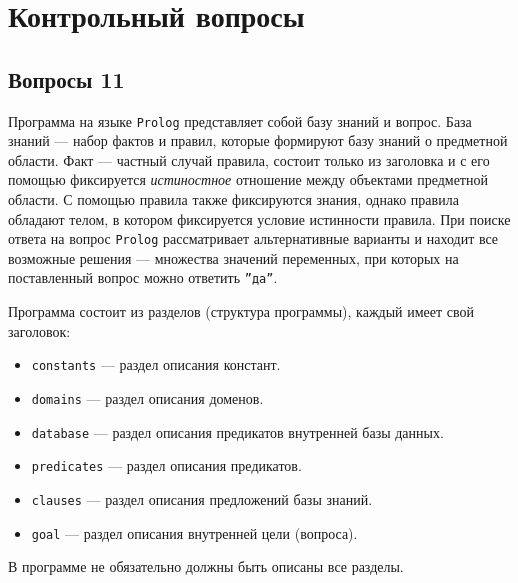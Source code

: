 \chapter{Контрольный вопросы}

\section{Вопросы 11}
Программа на языке \texttt{Prolog} представляет собой базу знаний и вопрос. База знаний --- набор фактов и правил, которые формируют базу знаний о предметной области. Факт --- частный случай правила, состоит только из заголовка и с его помощью фиксируется \textit{истиностное} отношение между объектами предметной области. С помощью правила также фиксируются знания, однако правила обладают телом, в котором фиксируется условие истинности правила. При поиске ответа на вопрос \texttt{Prolog} рассматривает альтернативные варианты и находит все возможные решения --- множества значений переменных, при которых на поставленный вопрос можно ответить \texttt{''да''}.

Программа состоит из разделов (структура программы), каждый имеет свой заголовок:
\begin{itemize}
    \item \texttt{constants} --- раздел описания констант.
    \item \texttt{domains} --- раздел описания доменов.
    \item \texttt{database} --- раздел описания предикатов внутренней базы данных.
    \item \texttt{predicates} --- раздел описания предикатов.
    \item \texttt{clauses} --- раздел описания предложений базы знаний.
    \item \texttt{goal} --- раздел описания внутренней цели (вопроса).
\end{itemize}

В программе не обязательно должны быть описаны все разделы.

